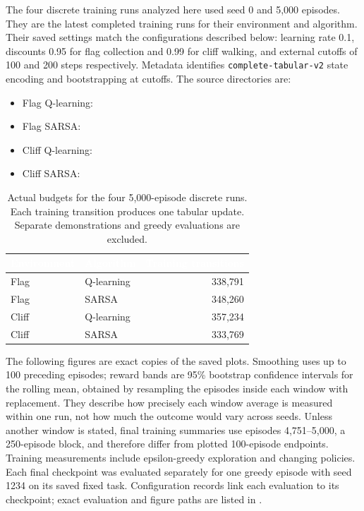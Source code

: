 \documentclass[11pt,a4paper]{article}
\theoremstyle{definition}
\theoremstyle{plain}
\theoremstyle{remark}
\newcommand{\code}[1]{\texttt{#1}}
\newcommand{\thcell}[1]{\textcolor{white}{\textbf{#1}}}
\begin{document}
The four discrete training runs analyzed here used seed 0 and 5,000 episodes. They are the latest completed training runs for their environment and algorithm. Their saved settings match the configurations described below: learning rate 0.1, discounts 0.95 for flag collection and 0.99 for cliff walking, and external cutoffs of 100 and 200 steps respectively. Metadata identifies \code{complete-tabular-v2} state encoding and bootstrapping at cutoffs. The source directories are:
\begin{itemize}
 \item Flag Q-learning: 
 \item Flag SARSA: 
 \item Cliff Q-learning:
 \item Cliff SARSA: 
\end{itemize}

\begin{table}[h!]
\centering\small
\begin{tabularx}{\linewidth}{@{}YYr@{}}
\toprule
{}\thcell{Environment}&\thcell{Algorithm}&\thcell{Training transitions}\\
\midrule
Flag&Q-learning&338,791\\
 Flag&SARSA&348,260\\
Cliff&Q-learning&357,234\\
 Cliff&SARSA&333,769\\
\bottomrule
\end{tabularx}
\caption{Actual budgets for the four 5,000-episode discrete runs. Each training transition produces one tabular update. Separate demonstrations and greedy evaluations are excluded.}
\label{tab:discrete-budgets}
\end{table}

The following figures are exact copies of the saved plots. Smoothing uses up to 100 preceding episodes; reward bands are 95\% bootstrap confidence intervals for the rolling mean, obtained by resampling the episodes inside each window with replacement. They describe how precisely each window average is measured within one run, not how much the outcome would vary across seeds. Unless another window is stated, final training summaries use episodes 4,751--5,000, a 250-episode block, and therefore differ from plotted 100-episode endpoints. Training measurements include epsilon-greedy exploration and changing policies. Each final checkpoint was evaluated separately for one greedy episode with seed 1234 on its saved fixed task. Configuration records link each evaluation to its checkpoint; exact evaluation and figure paths are listed in .
\end{document}

